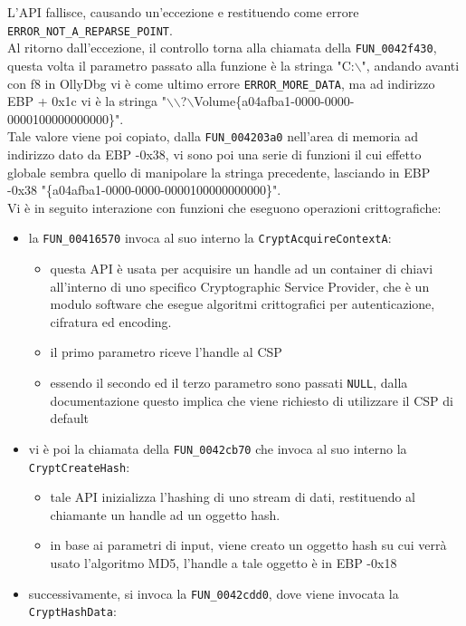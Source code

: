 \documentclass[12pt]{extarticle}
\begin{document}
L'API fallisce, causando un'eccezione e restituendo come errore \texttt{ERROR\_NOT\_A\_REPARSE\_POINT}.\\Al ritorno dall'eccezione, il controllo torna alla chiamata della \texttt{FUN\_0042f430}, questa volta il parametro passato alla funzione è la stringa "C:$\backslash$", andando avanti con f8 in OllyDbg vi è come ultimo errore \texttt{ERROR\_MORE\_DATA}, ma ad indirizzo EBP + 0x1c vi è la stringa "$\backslash$$\backslash$?$\backslash$Volume\{a04afba1-0000-0000-0000100000000000\}".\\Tale valore viene poi copiato, dalla \texttt{FUN\_004203a0} nell'area di memoria ad indirizzo dato da EBP -0x38, vi sono poi una serie di funzioni il cui effetto globale sembra quello di manipolare la stringa precedente, lasciando in EBP -0x38 "\{a04afba1-0000-0000-0000100000000000\}".\\Vi è in seguito interazione con funzioni che eseguono operazioni crittografiche:
\begin{itemize}
    \item la \texttt{FUN\_00416570} invoca al suo interno la \texttt{CryptAcquireContextA}:
    \begin{itemize}
        \item questa API è usata per acquisire un handle ad un container di chiavi all'interno di uno specifico Cryptographic Service Provider, che è un modulo software che esegue algoritmi crittografici per autenticazione, cifratura ed encoding.
        \item il primo parametro riceve l'handle al CSP
        \item essendo il secondo ed il terzo parametro sono passati \texttt{NULL}, dalla documentazione questo implica che viene richiesto di utilizzare il CSP di default
    \end{itemize}
    \item vi è poi la chiamata della \texttt{FUN\_0042cb70} che invoca al suo interno la \texttt{CryptCreateHash}: 
    \begin{itemize}
        \item tale API inizializza l'hashing di uno stream di dati, restituendo al chiamante un handle ad un oggetto hash.
        \item in base ai parametri di input, viene creato un oggetto hash su cui verrà usato l'algoritmo MD5, l'handle a tale oggetto è in EBP -0x18
    \end{itemize}
    \item successivamente, si invoca la \texttt{FUN\_0042cdd0}, dove viene invocata la \texttt{CryptHashData}:

\end{itemize}$$
\end{document}
